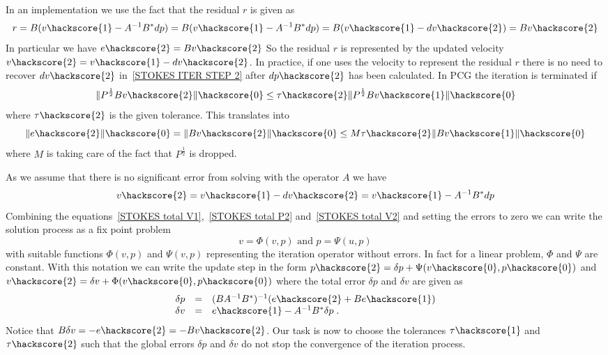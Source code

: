 In an implementation we use the fact that the residual $r$ is given as
\begin{equation} \label{STOKES RES }
 r= B (v\hackscore{1} -  A^{-1} B^{*} dp) =  B (v\hackscore{1} - A^{-1} B^{*} dp) = B (v\hackscore{1}-dv\hackscore{2}) = B v\hackscore{2}
\end{equation}
In particular we have $e\hackscore{2} = B v\hackscore{2}$
So the residual $r$ is represented by the updated velocity $v\hackscore{2}=v\hackscore{1}-dv\hackscore{2}$. In practice, if
one uses the velocity to represent the residual $r$ there is no need 
to recover $dv\hackscore{2}$ in~\ref{STOKES ITER STEP 2} after $dp\hackscore{2}$ has been calculated.
In PCG the iteration is terminated if
\begin{equation} \label{STOKES P OPERATOR ERROR}
\| P^{\frac{1}{2}}B v\hackscore{2} \|\hackscore{0} \le \tau\hackscore{2} \| P^{\frac{1}{2}}B v\hackscore{1} \|\hackscore{0}
\end{equation}
where $\tau\hackscore{2}$ is the given tolerance. This translates into
\begin{equation} \label{STOKES P OPERATOR ERROR 2}
\|e\hackscore{2}\|\hackscore{0} = \| B v\hackscore{2} \|\hackscore{0} \le M \tau\hackscore{2} \| B v\hackscore{1} \|\hackscore{0}
\end{equation}
where $M$ is taking care of the fact that $P^{\frac{1}{2}}$ is dropped.   

As we assume that there is no significant error from solving with the operator $A$ we have 
\begin{equation} \label{STOKES total V2}
v\hackscore{2} =  v\hackscore{1} - dv\hackscore{2} 
= v\hackscore{1}  - A^{-1} B^{*}dp 
\end{equation}
Combining the equations~\ref{STOKES total V1},~\ref{STOKES total P2} and~\ref{STOKES total V2} and
setting the errors to zero we can write the solution process as a fix point problem 
\begin{equation} 
v = \Phi(v,p) \mbox{ and } p = \Psi(u,p) 
\end{equation}
with suitable functions $\Phi(v,p)$ and $ \Psi(v,p)$ representing the iteration operator without 
errors. In fact for a linear problem,  $\Phi$ and $\Psi$ are constant. With this notation we can write
the update step in the form $p\hackscore{2}= \delta p + \Psi(v\hackscore{0},p\hackscore{0})$ and 
$v\hackscore{2}= \delta v + \Phi(v\hackscore{0},p\hackscore{0})$ where 
the total error $\delta p$ and $\delta v$ are given as
\begin{equation} 
 \begin{array}{rcl}
\delta p & = &  (B A^{-1} B^{*})^{-1} ( e\hackscore{2} + B e\hackscore{1} ) \\
\delta v & = &  e\hackscore{1} -  A^{-1} B^{*}\delta p  \;.
\end{array}\label{STOKES ERRORS}
\end{equation}
Notice that $B\delta v = - e\hackscore{2}=-Bv\hackscore{2}$. Our task is now to choose the tolerances
$\tau\hackscore{1}$ and $\tau\hackscore{2}$ such that the global errors $\delta p$ and $\delta v$
do not stop the convergence of the iteration process. 

